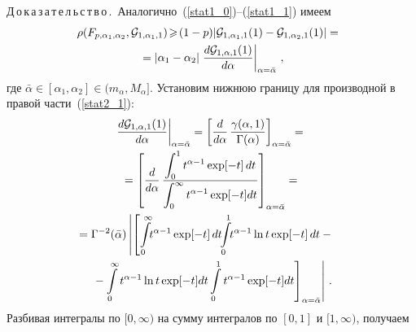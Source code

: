 \begin{multicols}{2}
\noindent
Д\,о\,к\,а\,з\,а\,т\,е\,л\,ь\,с\,т\,в\,о\,.\
Аналогично~(\ref{stat1_0})--(\ref{stat1_1}) имеем
\begin{multline}
\hspace*{-2pt}\!\rho(F_{p,\alpha_1,\alpha_2}, {\mathcal G}_{1,\alpha_1,1} )
\!\geqslant \!(1-p) |{\mathcal G}_{1,\alpha_1,1}(1) - {\mathcal
G}_{1,\alpha_2,1}(1)| ={}\\
{}= |\alpha_1-\alpha_2| \left.\displaystyle\frac{\displaystyle d{\mathcal
G}_{1,\alpha,1}(1)\mathstrut}{\displaystyle d\alpha\mathstrut}\right|_{\alpha = \bar\alpha}\,,
\label{stat2_1}
\end{multline}
где $\bar\alpha \in [\alpha_1,\alpha_2] \in (m_{\alpha},
M_{\alpha}]$. Установим нижнюю границу для производной в правой
части~(\ref{stat2_1}):
\begin{multline*}
\left.\fr{d{\mathcal G}_{1,\alpha,1}(1)}{d\alpha}\right|_{\alpha
= \bar\alpha} = \left[\fr{d}{d\alpha} \,
\fr{\gamma(\alpha,1)}{\Gamma(\alpha)} \right]_{\alpha =\bar\alpha} = {}\\
{}=
\left[\fr{d}{d\alpha} \, \fr{\int_0^1 t^{\alpha-1}\exp[-t]\,dt}
{\int_0^{\infty} t^{\alpha-1}\exp[-t]dt} \right]_{\alpha = \bar\alpha} ={} \\
\!\!\!\!\!{}= \Gamma^{-2}(\bar\alpha)  \left\vert  \left[
\int\limits_0^{\infty}\!\! t^{\alpha-1}\exp[-t]\,dt\! \!\int\limits_0^1\! \!t^{\alpha-1}\ln t \exp[-t]\,dt-{}\right.\right. \\
\left.\left.{}-\int\limits_0^{\infty} t^{\alpha-1}\ln t\exp[-t]dt
\int\limits_0^1 t^{\alpha-1}\exp[-t]dt \right]_{\alpha =
\bar\alpha} \right\vert\,.
\end{multline*}
Разбивая интегралы по $[0,\infty)$ на сумму интегралов по $[0,1]$
и $[1,\infty)$, получаем


\end{multicols}
